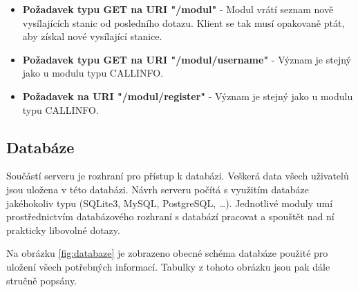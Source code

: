 \begin{itemize}
\item \textbf{Požadavek typu GET na URI "/modul"} - Modul vrátí seznam nově vysílajících stanic od posledního dotazu. Klient se tak
musí opakovaně ptát, aby získal nové vysílající stanice.
\item \textbf{Požadavek typu GET na URI "/modul/username"} - Význam je stejný jako u modulu typu CALLINFO.
\item \textbf{Požadavek na URI "/modul/register"} - Význam je stejný jako u modulu typu CALLINFO.
\end{itemize}

\subsection{Databáze}
\label{navrh_databaze}

Součástí serveru je rozhraní pro přístup k databázi. Veškerá data všech
uživatelů jsou uložena v této databázi.
Návrh serveru počítá s využitím databáze jakéhokoliv typu (SQLite3, MySQL, PostgreSQL, \dots). Jednotlivé moduly
umí prostřednictvím databázového rozhraní s databází pracovat a spouštět nad ní prakticky libovolné dotazy.

Na obrázku \ref{fig:databaze} je zobrazeno obecné schéma databáze použité pro uložení všech potřebných informací. Tabulky
z tohoto obrázku jsou pak dále stručně popsány.

